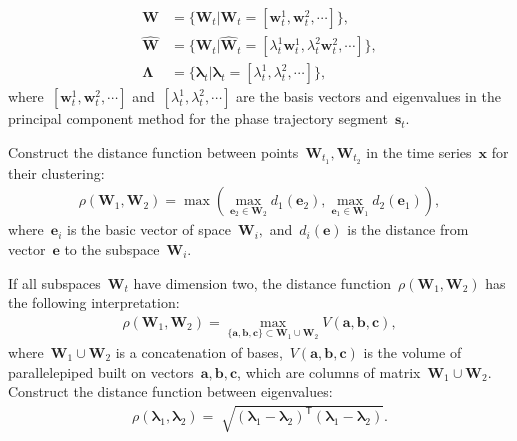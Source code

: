 \documentclass[12pt, twoside]{article}
\numberwithin{equation}{section}
\begin{document}
\begin{equation}
\label{eq:cl:3}
\begin{aligned}
\mathbf{W} &= \{\textbf{W}_t| \textbf{W}_t = [\textbf{w}^1_t, \textbf{w}^2_t, \cdots]\},\\ 
\hat{\mathbf{W}} &= \{\hat{\textbf{W}}_t| \hat{\textbf{W}}_t = [\lambda^1_t\textbf{w}^1_t, \lambda^2_t\textbf{w}^2_t, \cdots]\}, \\
 \bm{\Lambda} &= \{\bm{\lambda}_t| \bm{\lambda}_t=[\lambda^1_t, \lambda^2_t, \cdots]\},
\end{aligned}
\end{equation}
where~$[\textbf{w}^1_t, \textbf{w}^2_t, \cdots]$ and~$[\lambda^1_t, \lambda^2_t, \cdots]$ are the basis vectors and eigenvalues in the principal component method for the phase trajectory segment~$\textbf{s}_t$.



Construct the distance function between points~$\mathbf{W}_{t_1},\mathbf{W}_{t_2}$ in the time series~$\textbf{x}$ for their clustering:
\begin{equation}
\label{eq:cl:4}
\begin{aligned}
\rho\left(\textbf{W}_1, \textbf{W}_2\right) = \max\left(\max_{\textbf{e}_2 \in \textbf{W}_2} d_{1}\left(\textbf{e}_2\right), \max_{\textbf{e}_1 \in \textbf{W}_1} d_{2}\left(\textbf{e}_1\right)\right),
\end{aligned}
\end{equation}
where~$\textbf{e}_i$ is the basic vector of space~$\textbf{W}_i,$ and~$d_i\left(\textbf{e}\right)$ is the distance from vector~$\textbf{e}$ to the subspace~$\textbf{W}_i$.

If all subspaces~$\textbf{W}_t$ have dimension two, the distance function~$\rho\left(\textbf{W}_1, \textbf{W}_2\right)$ has the following interpretation:
\begin{equation}
\label{eq:cl:5}
\begin{aligned}
\rho\left(\textbf{W}_1, \textbf{W}_2\right) = \max_{\{\textbf{a},\textbf{b},\textbf{c}\} \subset \textbf{W}_1\cup \textbf{W}_2 } V\left(\textbf{a},\textbf{b},\textbf{c}\right), 
\end{aligned}
\end{equation}
where~$\textbf{W}_1\cup\textbf{W}_2$ is a concatenation of bases,~$V\left(\textbf{a},\textbf{b},\textbf{c}\right)$ is the volume of parallelepiped built on vectors~$\textbf{a}, \textbf{b}, \textbf{c}$, which are columns of matrix~$\textbf{W}_1\cup\textbf{W}_2$.
Construct the distance function between eigenvalues:
\begin{equation}
\label{eq:cl:6}
\begin{aligned}
\rho\left(\bm{\lambda}_1, \bm{\lambda}_2\right) = \sqrt[]{\left(\bm{\lambda}_1 - \bm{\lambda}_2\right)^{\mathsf{T}}\left(\bm{\lambda}_1 - \bm{\lambda}_2\right)}.
\end{aligned}
\end{equation}
\end{document}
